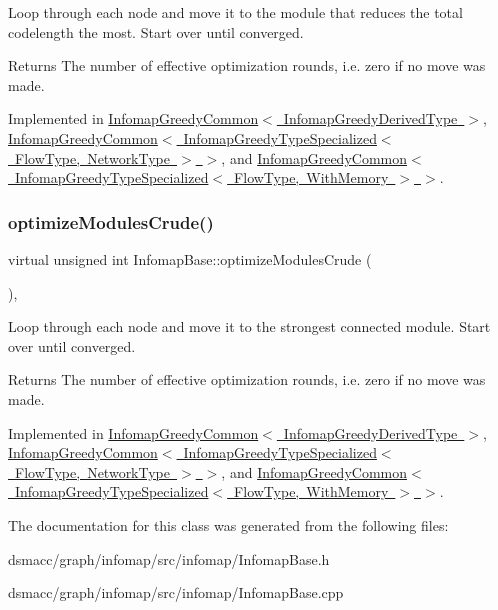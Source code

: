 Loop through each node and move it to the module that reduces the total codelength the most. Start over until converged.

\begin{DoxyReturn}{Returns}
The number of effective optimization rounds, i.\+e. zero if no move was made. 
\end{DoxyReturn}


Implemented in \mbox{\hyperlink{classInfomapGreedyCommon_a17feb30bfa3d448f7933c3fcc237f833}{Infomap\+Greedy\+Common$<$ Infomap\+Greedy\+Derived\+Type $>$}}, \mbox{\hyperlink{classInfomapGreedyCommon_a17feb30bfa3d448f7933c3fcc237f833}{Infomap\+Greedy\+Common$<$ Infomap\+Greedy\+Type\+Specialized$<$ Flow\+Type, Network\+Type $>$ $>$}}, and \mbox{\hyperlink{classInfomapGreedyCommon_a17feb30bfa3d448f7933c3fcc237f833}{Infomap\+Greedy\+Common$<$ Infomap\+Greedy\+Type\+Specialized$<$ Flow\+Type, With\+Memory $>$ $>$}}.

\mbox{\label{classInfomapBase_acb6dc935567c31d7ada4b514c5b8dcea}} 
\subsubsection{\texorpdfstring{optimize\+Modules\+Crude()}{optimizeModulesCrude()}}
{\footnotesize\ttfamily virtual unsigned int Infomap\+Base\+::optimize\+Modules\+Crude (\begin{DoxyParamCaption}{ }\end{DoxyParamCaption})\hspace{0.3cm}{\ttfamily [protected]}, {}}

Loop through each node and move it to the strongest connected module. Start over until converged.

\begin{DoxyReturn}{Returns}
The number of effective optimization rounds, i.\+e. zero if no move was made. 
\end{DoxyReturn}


Implemented in \mbox{\hyperlink{classInfomapGreedyCommon_a3b5e71572ae01ce0788f919290903b63}{Infomap\+Greedy\+Common$<$ Infomap\+Greedy\+Derived\+Type $>$}}, \mbox{\hyperlink{classInfomapGreedyCommon_a3b5e71572ae01ce0788f919290903b63}{Infomap\+Greedy\+Common$<$ Infomap\+Greedy\+Type\+Specialized$<$ Flow\+Type, Network\+Type $>$ $>$}}, and \mbox{\hyperlink{classInfomapGreedyCommon_a3b5e71572ae01ce0788f919290903b63}{Infomap\+Greedy\+Common$<$ Infomap\+Greedy\+Type\+Specialized$<$ Flow\+Type, With\+Memory $>$ $>$}}.



The documentation for this class was generated from the following files\+:\begin{DoxyCompactItemize}
\item 
dsmacc/graph/infomap/src/infomap/Infomap\+Base.\+h\item 
dsmacc/graph/infomap/src/infomap/Infomap\+Base.\+cpp\end{DoxyCompactItemize}
